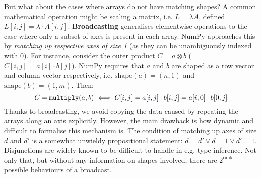 But what about the cases where arrays do not have matching shapes? A common mathematical operation might be scaling a matrix, i.e. $L = \lambda A$, defined $L[i, j] = \lambda \cdot A[i, j]$. \textbf{Broadcasting} generalises elementwise operations to the case where only a subset of axes is present in each array. NumPy approaches this by \textit{matching up respective axes of size 1} (as they can be unambiguously indexed with $0$). For instance, consider the outer product $C = a \otimes b$ ($C[i, j] = a[i] \cdot b[j] $). NumPy requires that $a$ and $b$ are shaped as a row vector and column vector respectively, i.e. $\mathrm{shape}(a) = (n, 1)$ and $\mathrm{shape}(b) = (1, m)$. Then:
$$ C = \texttt{multiply}(a, b) \iff C[i, j] = a[i, {\color{blue} j}] \cdot b[{\color{blue} i}, j] = a[i, 0] \cdot b[0, j] $$
Thanks to broadcasting, we avoid copying the data caused by repeating the arrays along an axis explicitly. However, the main drawback is how dynamic and difficult to formalise this mechanism is. The condition of matching up axes of size $d$ and $d'$ is a somewhat unwieldy propositional statement: $d = d' \lor d = 1 \lor d' = 1 $. Disjunctions are widely known to be difficult to handle in e.g. type inference.
Not only that, but without any information on shapes involved, there are $2^{\mathrm{rank}}$ possible behaviours of a broadcast.

